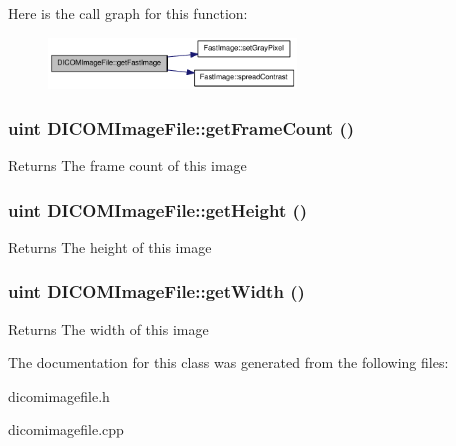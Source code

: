 Here is the call graph for this function:\nopagebreak
\begin{figure}[H]
\begin{center}
\leavevmode
\includegraphics[width=187pt]{class_d_i_c_o_m_image_file_a05f3f6fc5046ade1848a4d3c6561f6ad_cgraph}
\end{center}
\end{figure}


\hypertarget{class_d_i_c_o_m_image_file_aec56b3e9d86b2af4206e38406714941f}{
\subsubsection[{getFrameCount}]{\setlength{\rightskip}{0pt plus 5cm}uint DICOMImageFile::getFrameCount ()}}
\label{class_d_i_c_o_m_image_file_aec56b3e9d86b2af4206e38406714941f}
\begin{DoxyReturn}{Returns}
The frame count of this image 
\end{DoxyReturn}
\hypertarget{class_d_i_c_o_m_image_file_abebf0dfb003c75c06c3955e65dd5b9a6}{
\subsubsection[{getHeight}]{\setlength{\rightskip}{0pt plus 5cm}uint DICOMImageFile::getHeight ()}}
\label{class_d_i_c_o_m_image_file_abebf0dfb003c75c06c3955e65dd5b9a6}
\begin{DoxyReturn}{Returns}
The height of this image 
\end{DoxyReturn}
\hypertarget{class_d_i_c_o_m_image_file_a4eb4186345395c61c7964e588a08e057}{
\subsubsection[{getWidth}]{\setlength{\rightskip}{0pt plus 5cm}uint DICOMImageFile::getWidth ()}}
\label{class_d_i_c_o_m_image_file_a4eb4186345395c61c7964e588a08e057}
\begin{DoxyReturn}{Returns}
The width of this image 
\end{DoxyReturn}


The documentation for this class was generated from the following files:\begin{DoxyCompactItemize}
\item 
dicomimagefile.h\item 
dicomimagefile.cpp\end{DoxyCompactItemize}
